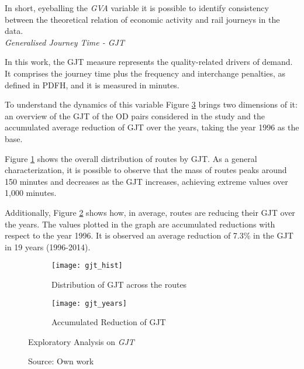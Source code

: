 In short, eyeballing the \textit{GVA} variable it is possible to identify consistency between the theoretical relation of economic activity and rail journeys in the data.
\\[3pt]



\textit{Generalised Journey Time - GJT}

In this work, the GJT measure represents the quality-related drivers of demand. It comprises the journey time plus the frequency and interchange penalties, as defined in PDFH, and it is measured in minutes.

To understand the dynamics of this variable Figure \ref{fig:gjt} brings two dimensions of it: an overview of the GJT of the OD pairs considered in the study and the accumulated average reduction of GJT over the years, taking the year 1996 as the base.

Figure \ref{fig:gjt_hist} shows the overall distribution of routes by GJT. As a general characterization, it is possible to observe that the mass of routes peaks around 150 minutes and decreases as the GJT increases, achieving extreme values over 1,000 minutes. 

Additionally, Figure \ref{fig:gjt_years} shows how, in average, routes are reducing their GJT over the years. The values plotted in the graph are accumulated reductions with respect to the year 1996. It is observed an average reduction of 7.3\% in the GJT in 19 years (1996-2014).

\begin{figure}[H]
\centering
\begin{subfigure}{.5\textwidth}
  \centering
  \texttt{[image: gjt\_hist]}
  \caption{Distribution of GJT across the routes}
  \label{fig:gjt_hist}
\end{subfigure}%
\begin{subfigure}{.5\textwidth}
  \centering
  \texttt{[image: gjt\_years]}
  \caption{Accumulated Reduction of GJT}
  \label{fig:gjt_years}
\end{subfigure}%
\caption{Exploratory Analysis on \textit{GJT}}
\label{fig:gjt}
\caption*{Source: Own work}
\end{figure}

